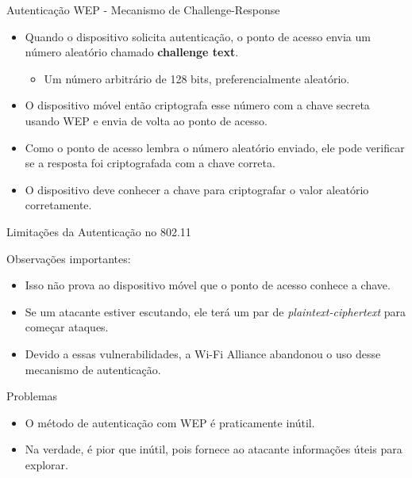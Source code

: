 \begin{frame}{Autenticação WEP - Mecanismo de Challenge-Response}



\begin{itemize}
    \item Quando o dispositivo solicita autenticação, o ponto de acesso envia um número aleatório chamado \textbf{challenge text}.
    \begin{itemize}
        \item Um número arbitrário de 128 bits, preferencialmente aleatório.
    \end{itemize}
\end{itemize}



\begin{itemize}
    \item O dispositivo móvel então criptografa esse número com a chave secreta usando WEP e envia de volta ao ponto de acesso.
    \item Como o ponto de acesso lembra o número aleatório enviado, ele pode verificar se a resposta foi criptografada com a chave correta.
    \item O dispositivo deve conhecer a chave para criptografar o valor aleatório corretamente.
\end{itemize}



\end{frame}


\begin{frame}{Limitações da Autenticação no 802.11}

\begin{block}{Observações importantes:}
    \begin{itemize}
        \item Isso não prova ao dispositivo móvel que o ponto de acesso conhece a chave.
        \item Se um atacante estiver escutando, ele terá um par de \textit{plaintext-ciphertext} para começar ataques.
        \item Devido a essas vulnerabilidades, a Wi-Fi Alliance abandonou o uso desse mecanismo de autenticação.
    \end{itemize}
\end{block}

\begin{block}{Problemas}
\begin{itemize}
    \item O método de autenticação com WEP é praticamente inútil.  
    \item Na verdade, é pior que inútil, pois fornece ao atacante informações úteis para explorar.  
\end{itemize}
\end{block}


\end{frame}


